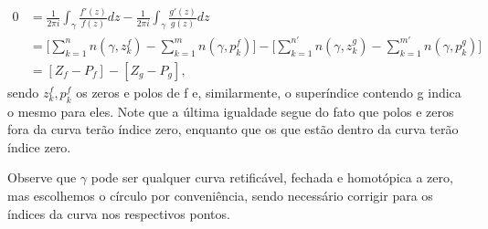 \documentclass[complex.tex]{subfiles}
\begin{document}
\begin{proof*}
	\begin{align*}
		0 & = \frac{1}{2\pi i}\int_{\gamma }^{}\frac{f'(z)}{f(z)}dz - \frac{1}{2\pi i}\int_{\gamma }^{}\frac{g'(z)}{g(z)}dz                                                                                                   \\
		  & = \biggl[\sum\limits_{k=1}^{n}n(\gamma , z_{k}^{f}) - \sum\limits_{k=1}^{m}n(\gamma , p_{k}^{f})\biggr] - \biggl[\sum\limits_{k=1}^{n'}n(\gamma , z_{k}^{g}) - \sum\limits_{k=1}^{m'}n(\gamma , p_{k}^{g})\biggr] \\
		  & = [Z_{f} - P_{f}] - [Z_{g} - P_{g}],
	\end{align*}
	sendo \(z_{k}^{f}, p_{k}^{f}\) os zeros e polos de f e, similarmente, o superíndice contendo g indica o mesmo para eles. Note que a última igualdade segue do fato que polos e zeros fora da curva terão índice zero, enquanto
	que os que estão dentro da curva terão índice zero. \qedsymbol
\end{proof*}
Observe que \(\gamma \) pode ser qualquer curva retificável, fechada e homotópica a zero, mas escolhemos o círculo por conveniência, sendo necessário
corrigir para os índices da curva nos respectivos pontos.
\end{document}
